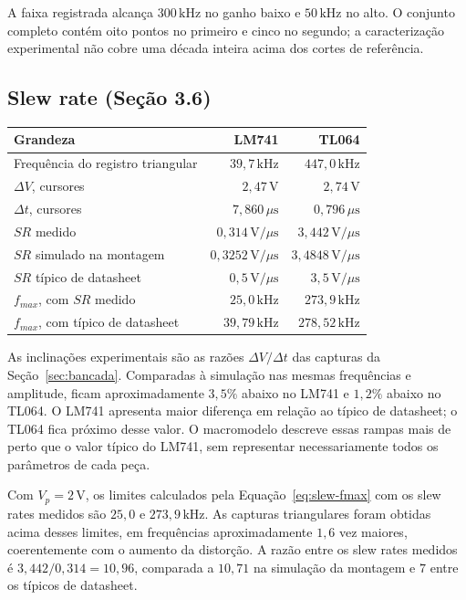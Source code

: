 \documentclass[11pt,a4paper]{article}
\begin{document}
A faixa registrada alcança \(300\,\text{kHz}\) no ganho baixo e \(50\,\text{kHz}\)
no alto. O conjunto completo contém oito pontos no primeiro e cinco no segundo;
a caracterização experimental não cobre uma década inteira acima dos cortes de referência.

\subsection{Slew rate (Seção 3.6)}

\begin{center}\small
\setlength{\tabcolsep}{4pt}
\begin{tabular}{@{}lrr@{}}
\toprule
\textbf{Grandeza} & \textbf{LM741} & \textbf{TL064} \\
\midrule
Frequência do registro triangular & \(39{,}7\,\text{kHz}\) & \(447{,}0\,\text{kHz}\) \\
\(\Delta V\), cursores & \(2{,}47\,\text{V}\) & \(2{,}74\,\text{V}\) \\
\(\Delta t\), cursores & \(7{,}860\,\mu\text{s}\) & \(0{,}796\,\mu\text{s}\) \\
\(SR\) medido & \(0{,}314\,\text{V}/\mu\text{s}\) & \(3{,}442\,\text{V}/\mu\text{s}\) \\
\(SR\) simulado na montagem & \(0{,}3252\,\text{V}/\mu\text{s}\) & \(3{,}4848\,\text{V}/\mu\text{s}\) \\
\(SR\) típico de datasheet & \(0{,}5\,\text{V}/\mu\text{s}\) & \(3{,}5\,\text{V}/\mu\text{s}\) \\
\(f_{max}\), com \(SR\) medido & \(25{,}0\,\text{kHz}\) & \(273{,}9\,\text{kHz}\) \\
\(f_{max}\), com típico de datasheet & \(39{,}79\,\text{kHz}\) & \(278{,}52\,\text{kHz}\) \\
\bottomrule
\end{tabular}
\end{center}

As inclinações experimentais são as razões \(\Delta V/\Delta t\) das capturas da
Seção~\ref{sec:bancada}. Comparadas à simulação nas mesmas frequências e amplitude,
ficam aproximadamente \(3{,}5\%\) abaixo no LM741 e \(1{,}2\%\) abaixo no TL064.
O LM741 apresenta maior diferença em relação ao típico de datasheet; o TL064 fica
próximo desse valor. O macromodelo descreve essas rampas mais de perto que o valor
típico do LM741, sem representar necessariamente todos os parâmetros de cada peça.

Com \(V_p=2\,\text{V}\), os limites calculados pela Equação~\eqref{eq:slew-fmax}
com os slew rates medidos são \(25{,}0\) e \(273{,}9\,\text{kHz}\).
As capturas triangulares foram obtidas acima desses limites, em frequências
aproximadamente \(1{,}6\) vez maiores, coerentemente com o aumento da distorção.
A razão entre os slew rates medidos é \(3{,}442/0{,}314=10{,}96\), comparada a
\(10{,}71\) na simulação da montagem e \(7\) entre os típicos de datasheet.
\end{document}
